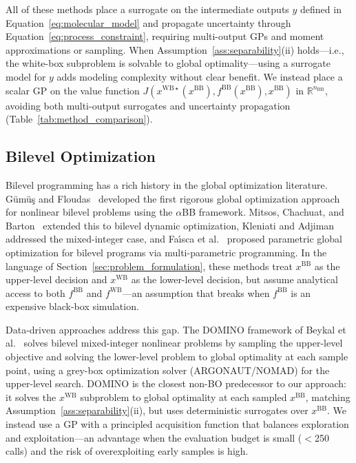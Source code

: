 \documentclass[12pt,a4paper]{article}%
\theoremstyle{plain}%
\theoremstyle{remark}%
\theoremstyle{definition}%
\def\WB{\mathrm{WB}}
\def\BB{\mathrm{BB}}
\begin{document}
All of these methods place a surrogate on the intermediate outputs $y$ defined in Equation~\eqref{eq:molecular_model} and propagate uncertainty through Equation~\eqref{eq:process_constraint}, requiring multi-output GPs and moment approximations or sampling. When Assumption~\ref{ass:separability}(ii) holds---i.e., the white-box subproblem is solvable to global optimality---using a surrogate model for $y$ adds modeling complexity without clear benefit. We instead place a scalar GP on the value function $J(x^{\WB\star}(x^{\BB}), f^{\BB}(x^{\BB}), x^{\BB})$ in $\mathbb{R}^{n_{\BB}}$, avoiding both multi-output surrogates and uncertainty propagation (Table~\ref{tab:method_comparison}).

\subsection{Bilevel Optimization}

Bilevel programming has a rich history in the global optimization literature. G\"{u}m\"{u}\c{s} and Floudas~\cite{gumus2001bilevel} developed the first rigorous global optimization approach for nonlinear bilevel problems using the $\alpha$BB framework. Mitsos, Chachuat, and Barton~\cite{mitsos2009bilevel_dynamic} extended this to bilevel dynamic optimization, Kleniati and Adjiman~\cite{kleniati2014bilevel} addressed the mixed-integer case, and Fa{\'\i}sca et al.~\cite{faisca2007bilevel} proposed parametric global optimization for bilevel programs via multi-parametric programming. In the language of Section~\ref{sec:problem_formulation}, these methods treat $x^{\BB}$ as the upper-level decision and $x^{\WB}$ as the lower-level decision, but assume analytical access to both $f^{\BB}$ and $f^{\WB}$---an assumption that breaks when $f^{\BB}$ is an expensive black-box simulation.

Data-driven approaches address this gap. The DOMINO framework of Beykal et al.~\cite{beykal2020domino} solves bilevel mixed-integer nonlinear problems by sampling the upper-level objective and solving the lower-level problem to global optimality at each sample point, using a grey-box optimization solver (ARGONAUT/NOMAD) for the upper-level search. DOMINO is the closest non-BO predecessor to our approach: it solves the $x^{\WB}$ subproblem to global optimality at each sampled $x^{\BB}$, matching Assumption~\ref{ass:separability}(ii), but uses deterministic surrogates over $x^{\BB}$. We instead use a GP with a principled acquisition function that balances exploration and exploitation---an advantage when the evaluation budget is small ($<$250 calls) and the risk of overexploiting early samples is high.
\end{document}
